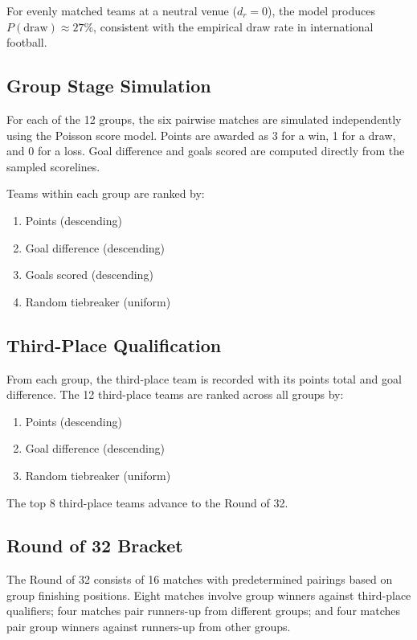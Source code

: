 \documentclass[11pt]{article}
\begin{document}
For evenly matched teams at a neutral venue ($d_r = 0$), the model produces $P(\text{draw}) \approx 27\%$, consistent with the empirical draw rate in international football.

\subsection{Group Stage Simulation}

For each of the 12 groups, the six pairwise matches are simulated independently using the Poisson score model. Points are awarded as 3 for a win, 1 for a draw, and 0 for a loss. Goal difference and goals scored are computed directly from the sampled scorelines.

Teams within each group are ranked by:
\begin{enumerate}[nosep]
    \item Points (descending)
    \item Goal difference (descending)
    \item Goals scored (descending)
    \item Random tiebreaker (uniform)
\end{enumerate}

\subsection{Third-Place Qualification}

From each group, the third-place team is recorded with its points total and goal difference. The 12 third-place teams are ranked across all groups by:
\begin{enumerate}[nosep]
    \item Points (descending)
    \item Goal difference (descending)
    \item Random tiebreaker (uniform)
\end{enumerate}
The top 8 third-place teams advance to the Round of 32.

\subsection{Round of 32 Bracket}

The Round of 32 consists of 16 matches with predetermined pairings based on group finishing positions. Eight matches involve group winners against third-place qualifiers; four matches pair runners-up from different groups; and four matches pair group winners against runners-up from other groups.
\end{document}
